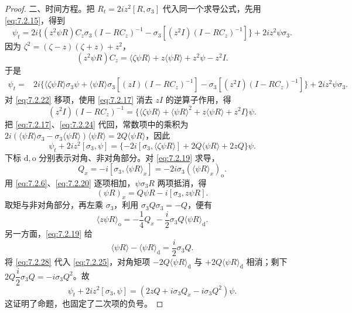\documentclass[lang=cn,scheme=chinese,mode=simple,device=normal,color=blue,math=cm,thmcnt=section,12pt]{elegantbook}
\newcommand{\eqq}[2]{\tag{#1}\label{eq:#1}#2}
\begin{document}
\begin{proof}
{\heiti 二、时间方程。}把 $R_t=2iz^2[R,\sigma_3]$ 代入同一个求导公式，先用 \eqref{eq:7.2.15}，得到
\begin{equation}
\eqq{7.2.21}{\psi_t=2i\{(z^2\psi R)C_z\sigma_3(I-RC_z)^{-1}
-\sigma_3[(z^2I)(I-RC_z)^{-1}]\}+2iz^2\psi\sigma_3.}
\end{equation}
因为 $\zeta^2=(\zeta-z)(\zeta+z)+z^2$，
\begin{equation}
\eqq{7.2.22}{(z^2\psi R)C_z=\langle\zeta\psi R\rangle+z\langle\psi R\rangle+z^2\psi-z^2I.}
\end{equation}
于是
\begin{equation}
\eqq{7.2.23}{\begin{aligned}
\psi_t={}&2i\{\langle\zeta\psi R\rangle\sigma_3\psi
+\langle\psi R\rangle\sigma_3[(zI)(I-RC_z)^{-1}]
-\sigma_3[(z^2I)(I-RC_z)^{-1}]\}+2iz^2\psi\sigma_3.
\end{aligned}}
\end{equation}
对 \eqref{eq:7.2.22} 移项，使用 \eqref{eq:7.2.17} 消去 $zI$ 的逆算子作用，得
\begin{equation}
\eqq{7.2.24}{(z^2I)(I-RC_z)^{-1}
=\{\langle\zeta\psi R\rangle+\langle\psi R\rangle^2+z\langle\psi R\rangle+z^2I\}\psi.}
\end{equation}
把 \eqref{eq:7.2.17}、\eqref{eq:7.2.24} 代回，常数项中的乘积为
$2i(\langle\psi R\rangle\sigma_3-\sigma_3\langle\psi R\rangle)\langle\psi R\rangle=2Q\langle\psi R\rangle$，因此
\begin{equation}
\eqq{7.2.25}{\psi_t+2iz^2[\sigma_3,\psi]
=\{-2i[\sigma_3,\langle\zeta\psi R\rangle]+2Q\langle\psi R\rangle+2zQ\}\psi.}
\end{equation}
下标 $\mathrm d,\mathrm o$ 分别表示对角、非对角部分。对 \eqref{eq:7.2.19} 求导，
\begin{equation}
\eqq{7.2.26}{Q_x=-i[\sigma_3,\langle\psi R\rangle_x]
=-2i\sigma_3(\langle\psi R\rangle_x)_{\mathrm o}.}
\end{equation}
用 \eqref{eq:7.2.6}、\eqref{eq:7.2.20} 逐项相加，$\psi\sigma_3R$ 两项抵消，得
\begin{equation}
\eqq{7.2.27}{(\psi R)_x=Q\psi R-i[\sigma_3,z\psi R].}
\end{equation}
取矩与非对角部分，再左乘 $\sigma_3$，利用 $\sigma_3Q\sigma_3=-Q$，便有
\begin{equation}
\eqq{7.2.28}{\langle z\psi R\rangle_{\mathrm o}
=-\dfrac{1}{4}Q_x-\dfrac{i}{2}\sigma_3Q\langle\psi R\rangle_{\mathrm d}.}
\end{equation}
另一方面，\eqref{eq:7.2.19} 给
\begin{equation}
\eqq{7.2.29}{\langle\psi R\rangle-\langle\psi R\rangle_{\mathrm d}=\dfrac{i}{2}\sigma_3Q.}
\end{equation}
将 \eqref{eq:7.2.28} 代入 \eqref{eq:7.2.25}，对角矩项 $-2Q\langle\psi R\rangle_{\mathrm d}$ 与 $+2Q\langle\psi R\rangle_{\mathrm d}$ 相消；剩下
$2Q\dfrac{i}{2}\sigma_3Q=-i\sigma_3Q^2$。故
\begin{equation}
\eqq{7.2.30}{\psi_t+2iz^2[\sigma_3,\psi]=(2zQ+i\sigma_3Q_x-i\sigma_3Q^2)\psi.}
\end{equation}
这证明了命题，也固定了二次项的负号。
\end{proof}
\end{document}
